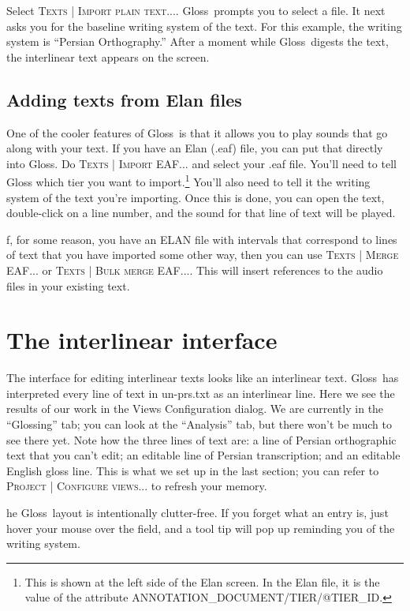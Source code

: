 \documentclass[oneside]{book}
\def\menu#1{\textsc{#1}}
\def\menu#1#2{\textsc{#1 | #2}}
\def\gloss{\textsf{Gloss}}
\def\tip#1\par{\medskip\noindent\fcolorbox{black}{light-gray}{\parbox{\textwidth}{#1}}\par\medskip}
\begin{document}
\medskip
Select \menu{Texts}{Import plain text...}. \gloss\ prompts you to select a file. It next asks you for the baseline writing system of the text. For this example, the writing system is ``Persian Orthography.'' After a moment while \gloss\ digests the text, the interlinear text appears on the screen.

\subsection{Adding texts from Elan files}
One of the cooler features of \gloss\ is that it allows you to play sounds that go along with your text. If you have an Elan (.eaf) file, you can put that directly into \gloss. Do \menu{Texts}{Import EAF...} and select your .eaf file. You'll need to tell Gloss which tier you want to import.\footnote{This is shown at the left side of the Elan screen. In the Elan file, it is the value of the attribute ANNOTATION\_DOCUMENT/TIER/@TIER\_ID.} You'll also need to tell it the writing system of the text you're importing. Once this is done, you can open the text, double-click on a line number, and the sound for that line of text will be played.

\tip If, for some reason, you have an ELAN file with intervals that correspond to lines of text that you have imported some other way, then you can use \menu{Texts}{Merge EAF...} or \menu{Texts}{Bulk merge EAF...}. This will insert references to the audio files in your existing text.

\section{The interlinear interface}
The interface for editing interlinear texts looks like an interlinear text. \gloss\ has interpreted every line of text in un-prs.txt as an interlinear line. Here we see the results of our work in the Views Configuration dialog. We are currently in the ``Glossing'' tab; you can look at the ``Analysis'' tab, but there won't be much to see there yet. Note how the three lines of text are: a line of Persian orthographic text that you can't edit; an editable line of Persian transcription; and an editable English gloss line. This is what we set up in the last section; you can refer to \menu{Project}{Configure views...} to refresh your memory.

\tip The \gloss\ layout is intentionally clutter-free. If you forget what an entry is, just hover your mouse over the field, and a tool tip will pop up reminding you of the writing system.
\end{document}
